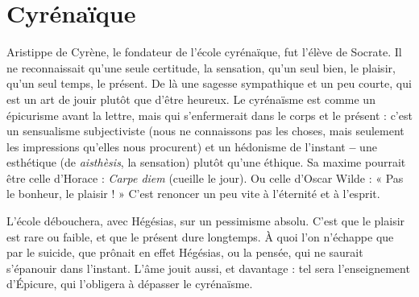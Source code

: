\section{Cyrénaïque}
Aristippe de Cyrène, le fondateur de l’école cyrénaïque, fut
l'élève de Socrate. Il ne reconnaissait qu’une seule certitude,
la sensation, qu’un seul bien, le plaisir, qu’un seul temps, le présent. De
là une sagesse sympathique et un peu courte, qui est un art de jouir plutôt que
d’être heureux. Le cyrénaïsme est comme un épicurisme avant la lettre, mais
qui s’enfermerait dans le corps et le présent : c’est un sensualisme subjectiviste
(nous ne connaissons pas les choses, mais seulement les impressions qu’elles
nous procurent) et un hédonisme de l’instant {\bf --} une esthétique (de {\it aisthèsis}, la
sensation) plutôt qu’une éthique. Sa maxime pourrait être celle d’Horace :
{\it Carpe diem} (cueille le jour). Ou celle d’Oscar Wilde : « Pas le bonheur, le
plaisir ! » C’est renoncer un peu vite à l'éternité et à l’esprit.

L'école débouchera, avec Hégésias, sur un pessimisme absolu. C’est que le
plaisir est rare ou faible, et que le présent dure longtemps. À quoi l’on
n'échappe que par le suicide, que prônait en effet Hégésias, ou la pensée, qui
ne saurait s'épanouir dans l'instant. L'âme jouit aussi, et davantage : tel sera
l’enseignement d’Épicure, qui l’obligera à dépasser le cyrénaïsme.


